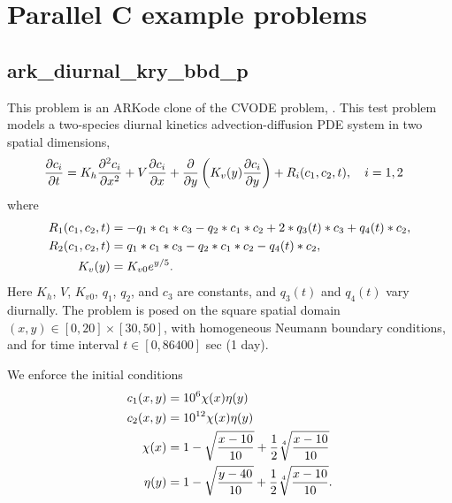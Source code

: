 \documentclass[letterpaper,10pt,english]{sphinxmanual}
\begin{document}
\chapter{Parallel C example problems}
\label{c_parallel::doc}\label{c_parallel:parallel-c-example-problems}\label{c_parallel:parallel-c}

\section{ark\_diurnal\_kry\_bbd\_p}
\label{c_parallel:ark-diurnal-kry-bbd-p}\label{c_parallel:id1}
This problem is an ARKode clone of the CVODE problem,
.  This test problem models a two-species
diurnal kinetics advection-diffusion PDE system in two spatial
dimensions,
\begin{gather}
\begin{split}\frac{\partial c_i}{\partial t} &=
  K_h \frac{\partial^2 c_i}{\partial x^2} +
  V \frac{\partial     c_i}{\partial x} +
  \frac{\partial}{\partial y}\left( K_v(y)
  \frac{\partial c_i}{\partial y}\right) +
  R_i(c_1,c_2,t),\quad i=1,2\end{split}\notag
\end{gather}
where
\begin{gather}
\begin{split}R_1(c_1,c_2,t) &= -q_1*c_1*c_3 - q_2*c_1*c_2 + 2*q_3(t)*c_3 + q_4(t)*c_2, \\
R_2(c_1,c_2,t) &=  q_1*c_1*c_3 - q_2*c_1*c_2 - q_4(t)*c_2, \\
K_v(y) &= K_{v0} e^{y/5}.\end{split}\notag
\end{gather}
Here \(K_h\), \(V\), \(K_{v0}\), \(q_1\), \(q_2\),
and \(c_3\) are constants, and \(q_3(t)\) and \(q_4(t)\)
vary diurnally.  The problem is posed on the square spatial domain
\((x,y) \in [0,20]\times[30,50]\), with homogeneous Neumann
boundary conditions, and for time interval \(t\in [0,86400]\) sec
(1 day).

We enforce the initial conditions
\begin{gather}
\begin{split}c_1(x,y) &=  10^6 \chi(x)\eta(y) \\
c_2(x,y) &=  10^{12} \chi(x)\eta(y) \\
\chi(x) &= 1 - \sqrt{\frac{x - 10}{10}} + \frac12 \sqrt[4]{\frac{x - 10}{10}} \\
\eta(y) &= 1 - \sqrt{\frac{y - 40}{10}} + \frac12 \sqrt[4]{\frac{x - 10}{10}}.\end{split}\notag
\end{gather}
\end{document}

